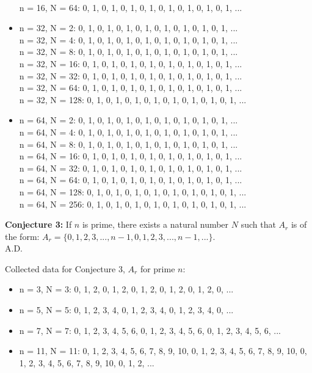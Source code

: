 \documentclass{article}
\begin{document}
\begin{flushleft}
\begin{itemize}
            \\ n = 16, N = 64:  0, 1, 0, 1, 0, 1, 0, 1, 0, 1, 0, 1, 0, 1, 0, 1, ...
        \item n = 32, N = 2:  0, 1, 0, 1, 0, 1, 0, 1, 0, 1, 0, 1, 0, 1, 0, 1, ...
            \\ n = 32, N = 4:  0, 1, 0, 1, 0, 1, 0, 1, 0, 1, 0, 1, 0, 1, 0, 1, ...
            \\ n = 32, N = 8:  0, 1, 0, 1, 0, 1, 0, 1, 0, 1, 0, 1, 0, 1, 0, 1, ...
            \\ n = 32, N = 16:  0, 1, 0, 1, 0, 1, 0, 1, 0, 1, 0, 1, 0, 1, 0, 1, ...
            \\ n = 32, N = 32:  0, 1, 0, 1, 0, 1, 0, 1, 0, 1, 0, 1, 0, 1, 0, 1, ...
            \\ n = 32, N = 64:  0, 1, 0, 1, 0, 1, 0, 1, 0, 1, 0, 1, 0, 1, 0, 1, ...
            \\ n = 32, N = 128:  0, 1, 0, 1, 0, 1, 0, 1, 0, 1, 0, 1, 0, 1, 0, 1, ...
        \item n = 64, N = 2:  0, 1, 0, 1, 0, 1, 0, 1, 0, 1, 0, 1, 0, 1, 0, 1, ...
            \\ n = 64, N = 4:  0, 1, 0, 1, 0, 1, 0, 1, 0, 1, 0, 1, 0, 1, 0, 1, ...
            \\ n = 64, N = 8:  0, 1, 0, 1, 0, 1, 0, 1, 0, 1, 0, 1, 0, 1, 0, 1, ...
            \\ n = 64, N = 16:  0, 1, 0, 1, 0, 1, 0, 1, 0, 1, 0, 1, 0, 1, 0, 1, ...
            \\ n = 64, N = 32:  0, 1, 0, 1, 0, 1, 0, 1, 0, 1, 0, 1, 0, 1, 0, 1, ...
            \\ n = 64, N = 64:  0, 1, 0, 1, 0, 1, 0, 1, 0, 1, 0, 1, 0, 1, 0, 1, ...
            \\ n = 64, N = 128:  0, 1, 0, 1, 0, 1, 0, 1, 0, 1, 0, 1, 0, 1, 0, 1, ...
            \\ n = 64, N = 256:  0, 1, 0, 1, 0, 1, 0, 1, 0, 1, 0, 1, 0, 1, 0, 1, ...
    \end{itemize}

\vspace{.1in}

{\bf Conjecture 3:} If $n$ is prime, there exists a natural number $N$ such that $A_r$ is of the form: $A_r=\{0,1,2,3,...,n-1,0,1,2,3,...,n-1,...\}$. \\
        \hspace{4.3in} A.D.
        
        Collected data for Conjecture 3, $A_r$ for prime $n$:
        \begin{itemize}
            \item n = 3, N = 3:  0, 1, 2, 0, 1, 2, 0, 1, 2, 0, 1, 2, 0, 1, 2, 0, ...
            \item n = 5, N = 5:  0, 1, 2, 3, 4, 0, 1, 2, 3, 4, 0, 1, 2, 3, 4, 0, ...
            \item n = 7, N = 7:  0, 1, 2, 3, 4, 5, 6, 0, 1, 2, 3, 4, 5, 6, 0, 1, 2, 3, 4, 5, 6, ...
            \item n = 11, N = 11:  0, 1, 2, 3, 4, 5, 6, 7, 8, 9, 10, 0, 1, 2, 3, 4, 5, 6, 7, 8, 9, 10, 0, 1, 2, 3, 4, 5, 6, 7, 8, 9, 10, 0, 1, 2, ...
        \end{itemize}


\end{flushleft}
\end{document}
